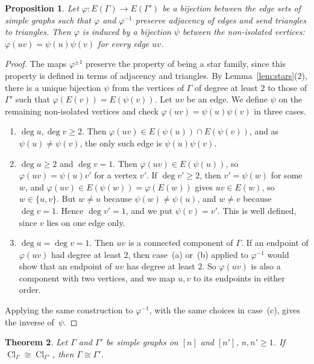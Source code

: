 \documentclass[11pt,a4paper]{article}
\numberwithin{equation}{section}
\theoremstyle{plain}
\newtheorem{theorem}{Theorem}[section]
\newtheorem{proposition}[theorem]{Proposition}
\theoremstyle{definition}
\theoremstyle{remark}
\DeclareMathOperator{\Cl}{Cl}
\begin{document}
\begin{proposition}\label{prop:edge-iso}
Let $\varphi\colon E(\Gamma)\to E(\Gamma')$ be a bijection between the edge sets of simple graphs such that $\varphi$ and $\varphi^{-1}$ preserve adjacency of edges and send triangles to triangles. Then $\varphi$ is induced by a bijection $\psi$ between the non-isolated vertices: $\varphi(uv)=\psi(u)\psi(v)$ for every edge $uv$.
\end{proposition}

\begin{proof}
The maps $\varphi^{\pm1}$ preserve the property of being a star family, since this property is defined in terms of adjacency and triangles. By Lemma~\ref{lem:stars}(2), there is a unique bijection $\psi$ from the vertices of $\Gamma$ of degree at least $2$ to those of $\Gamma'$ such that $\varphi(E(v))=E(\psi(v))$. Let $uv$ be an edge. We define $\psi$ on the remaining non-isolated vertices and check $\varphi(uv)=\psi(u)\psi(v)$ in three cases.
\begin{enumerate}[nosep,label=(\alph*)]
\item $\deg u,\deg v\geqslant2$. Then $\varphi(uv)\in E(\psi(u))\cap E(\psi(v))$, and as $\psi(u)\neq\psi(v)$, the only such edge is $\psi(u)\psi(v)$.
\item $\deg u\geqslant2$ and $\deg v=1$. Then $\varphi(uv)\in E(\psi(u))$, so $\varphi(uv)=\psi(u)v'$ for a vertex $v'$. If $\deg v'\geqslant2$, then $v'=\psi(w)$ for some $w$, and $\varphi(uv)\in E(\psi(w))=\varphi(E(w))$ gives $uv\in E(w)$, so $w\in\{u,v\}$. But $w\neq u$ because $\psi(w)\neq\psi(u)$, and $w\neq v$ because $\deg v=1$. Hence $\deg v'=1$, and we put $\psi(v)=v'$. This is well defined, since $v$ lies on one edge only.
\item $\deg u=\deg v=1$. Then $uv$ is a connected component of $\Gamma$. If an endpoint of $\varphi(uv)$ had degree at least $2$, then case~(a) or~(b) applied to $\varphi^{-1}$ would show that an endpoint of $uv$ has degree at least $2$. So $\varphi(uv)$ is also a component with two vertices, and we map $u,v$ to its endpoints in either order.
\end{enumerate}
Applying the same construction to $\varphi^{-1}$, with the same choices in case~(c), gives the inverse of~$\psi$.
\end{proof}

\begin{theorem}\label{thm:cl-rigid}
Let $\Gamma$ and $\Gamma'$ be simple graphs on $[n]$ and $[n']$, $n,n'\geqslant1$. If $\Cl_\Gamma\cong\Cl_{\Gamma'}$, then $\Gamma\cong\Gamma'$.
\end{theorem}
\end{document}
